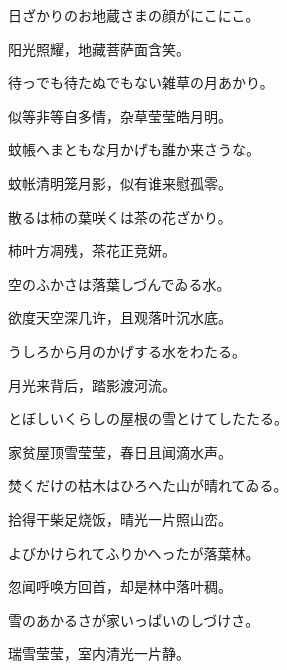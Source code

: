 \begin{haiku}
    {\FH 日ざかりのお地蔵さまの顔がにこにこ。}

    {\FK 阳光照耀，地藏菩萨面含笑。}
\end{haiku}

\begin{haiku}
    {\FH 待っでも待たぬでもない雑草の月あかり。}

    {\FK 似等非等自多情，杂草莹莹皓月明。}
\end{haiku}

\begin{haiku}
    {\FH 蚊帳へまともな月かげも誰か来さうな。}

    {\FK 蚊帐清明笼月影，似有谁来慰孤零。}
\end{haiku}

\begin{haiku}
    {\FH 散るは柿の葉咲くは茶の花ざかり。}

    {\FK 柿叶方凋残，茶花正竞妍。}
\end{haiku}

\begin{haiku}
    {\FH 空のふかさは落葉しづんでゐる水。}

    {\FK 欲度天空深几许，且观落叶沉水底。}
\end{haiku}

\begin{haiku}
    {\FH うしろから月のかげする水をわたる。}

    {\FK 月光来背后，踏影渡河流。}
\end{haiku}

\begin{haiku}
    {\FH とぼしいくらしの屋根の雪とけてしたたる。}

    {\FK 家贫屋顶雪莹莹，春日且闻滴水声。}
\end{haiku}

\begin{haiku}
    {\FH 焚くだけの枯木はひろへた山が晴れてゐる。}

    {\FK 拾得干柴足烧饭，晴光一片照山峦。}
\end{haiku}

\begin{haiku}
    {\FH よびかけられてふりかへったが落葉林。}

    {\FK 忽闻呼唤方回首，却是林中落叶稠。}
\end{haiku}

\begin{haiku}
    {\FH 雪のあかるさが家いっぱいのしづけさ。}

    {\FK 瑞雪莹莹，室内清光一片静。}
\end{haiku}


